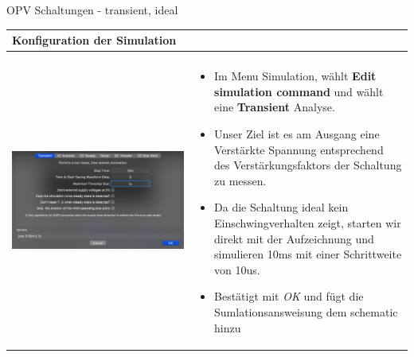 \begin{frame}[t]{OPV Schaltungen - transient, ideal}

  \begin{spacing}{0.9} \begin{tiny}
      \begin{table}[h!]
        \begin{tabular}{p{4cm} p{6cm}}
          \hline
          \textbf{Konfiguration der Simulation} & \\
          \hline                                  \\
          \begin{minipage}{.3\textwidth}
            \includegraphics[width=\linewidth]{pictures/simulationcmd_5.png}
          \end{minipage}
                                                &
          \begin{minipage}{.7\textwidth}
            \begin{itemize}
              \item Im Menu Simulation, wählt \textbf{Edit simulation command} und wählt eine \textbf{Transient} Analyse.
              \item Unser Ziel ist es am Ausgang eine Verstärkte Spannung entsprechend des Verstärkungsfaktors der Schaltung zu messen.
              \item Da die Schaltung ideal kein Einschwingverhalten zeigt, starten wir direkt mit der Aufzeichnung und simulieren 10ms mit einer Schrittweite von 10us.
              \item Bestätigt mit \textit{OK} und fügt die Sumlationsansweisung dem schematic hinzu
            \end{itemize}
          \end{minipage}
          \\

\end{tabular}
\end{table}
\end{tiny}
\end{spacing}
\end{frame}
